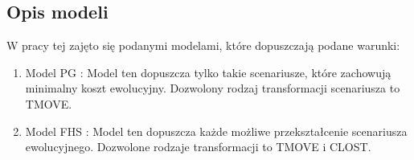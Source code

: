 \documentclass[licencjacka]{pracamgr}
\begin{document}
\subsection{Opis modeli}

W pracy tej zajęto się podanymi modelami, które dopuszczają podane warunki:
\begin{enumerate}
\item Model PG \cite{PG}: Model ten dopuszcza tylko takie scenariusze, które zachowują minimalny koszt ewolucyjny. Dozwolony rodzaj transformacji scenariusza to TMOVE.
\item Model FHS \cite{FHS}: Model ten dopuszcza każde możliwe przekształcenie scenariusza ewolucyjnego. Dozwolone rodzaje transformacji to TMOVE i CLOST.
\end{enumerate}

\begin{figure}[H]\label{diagram_red}
  \centering

\end{figure}
\end{document}
